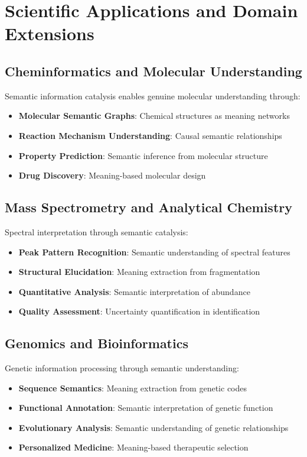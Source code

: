 \documentclass[12pt,a4paper,twoside]{article}
\begin{document}
\section{Scientific Applications and Domain Extensions}

\subsection{Cheminformatics and Molecular Understanding}

Semantic information catalysis enables genuine molecular understanding through:

\begin{itemize}
\item \textbf{Molecular Semantic Graphs}: Chemical structures as meaning networks
\item \textbf{Reaction Mechanism Understanding}: Causal semantic relationships
\item \textbf{Property Prediction}: Semantic inference from molecular structure
\item \textbf{Drug Discovery}: Meaning-based molecular design
\end{itemize}

\subsection{Mass Spectrometry and Analytical Chemistry}

Spectral interpretation through semantic catalysis:

\begin{itemize}
\item \textbf{Peak Pattern Recognition}: Semantic understanding of spectral features
\item \textbf{Structural Elucidation}: Meaning extraction from fragmentation
\item \textbf{Quantitative Analysis}: Semantic interpretation of abundance
\item \textbf{Quality Assessment}: Uncertainty quantification in identification
\end{itemize}

\subsection{Genomics and Bioinformatics}

Genetic information processing through semantic understanding:

\begin{itemize}
\item \textbf{Sequence Semantics}: Meaning extraction from genetic codes
\item \textbf{Functional Annotation}: Semantic interpretation of genetic function
\item \textbf{Evolutionary Analysis}: Semantic understanding of genetic relationships
\item \textbf{Personalized Medicine}: Meaning-based therapeutic selection
\end{itemize}
\end{document}
